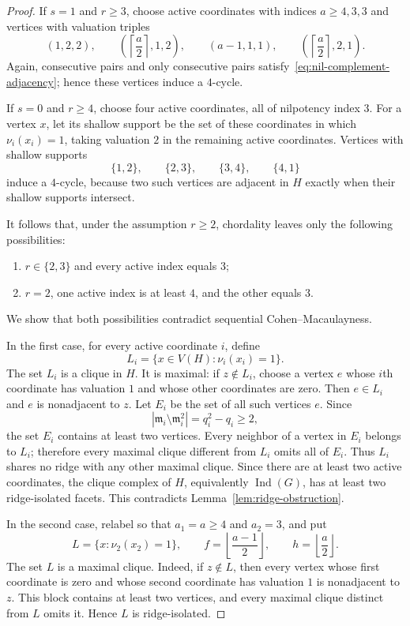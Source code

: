 \documentclass[12pt, reqno]{amsart}
\theoremstyle{definition}
\numberwithin{equation}{section}
\begin{document}
\begin{proof}
If $s=1$ and $r\ge3$, choose active coordinates with indices $a\ge4,3,3$ and vertices with valuation triples
\[
(1,2,2),\qquad
\left(\left\lceil\frac a2\right\rceil,1,2\right),\qquad
(a-1,1,1),\qquad
\left(\left\lceil\frac a2\right\rceil,2,1\right).
\]
Again, consecutive pairs and only consecutive pairs satisfy~\eqref{eq:nil-complement-adjacency}; hence these vertices induce a $4$-cycle.

If $s=0$ and $r\ge4$, choose four active coordinates, all of nilpotency index $3$.  For a vertex $x$, let its shallow support be the set of these coordinates in which $\nu_i(x_i)=1$, taking valuation $2$ in the remaining active coordinates.  Vertices with shallow supports
\[
\{1,2\},\qquad \{2,3\},\qquad \{3,4\},\qquad \{4,1\}
\]
induce a $4$-cycle, because two such vertices are adjacent in $H$ exactly when their shallow supports intersect.

It follows that, under the assumption $r\ge2$, chordality leaves only the following possibilities:
\begin{enumerate}
\item $r\in\{2,3\}$ and every active index equals $3$;
\item $r=2$, one active index is at least $4$, and the other equals $3$.
\end{enumerate}
We show that both possibilities contradict sequential Cohen--Macaulayness.

In the first case, for every active coordinate $i$, define
\[
L_i=\{x\in V(H):\nu_i(x_i)=1\}.
\]
The set $L_i$ is a clique in $H$.  It is maximal: if $z\notin L_i$, choose a vertex $e$ whose $i$th coordinate has valuation $1$ and whose other coordinates are zero.  Then $e\in L_i$ and $e$ is nonadjacent to $z$.  Let $E_i$ be the set of all such vertices $e$.  Since
\[
|\mathfrak m_i\setminus\mathfrak m_i^2|=q_i^2-q_i\ge2,
\]
the set $E_i$ contains at least two vertices.  Every neighbor of a vertex in $E_i$ belongs to $L_i$; therefore every maximal clique different from $L_i$ omits all of $E_i$.  Thus $L_i$ shares no ridge with any other maximal clique.  Since there are at least two active coordinates, the clique complex of $H$, equivalently $\operatorname{Ind}(G)$, has at least two ridge-isolated facets.  This contradicts Lemma~\ref{lem:ridge-obstruction}.

In the second case, relabel so that $a_1=a\ge4$ and $a_2=3$, and put
\[
L=\{x:\nu_2(x_2)=1\},
\qquad
f=\left\lfloor\frac{a-1}{2}\right\rfloor,
\qquad
h=\left\lfloor\frac a2\right\rfloor.
\]
The set $L$ is a maximal clique.  Indeed, if $z\notin L$, then every vertex whose first coordinate is zero and whose second coordinate has valuation $1$ is nonadjacent to $z$.  This block contains at least two vertices, and every maximal clique distinct from $L$ omits it.  Hence $L$ is ridge-isolated.


\end{proof}
\end{document}

